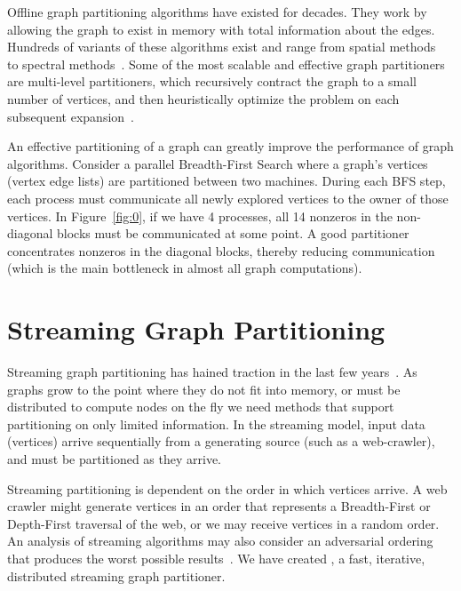 
Offline graph partitioning algorithms have existed for decades.
They work by allowing the graph to exist in memory with total information about the edges.
Hundreds of variants of these algorithms exist and range from spatial methods~\cite{Gilbert95geometricmesh} to spectral methods~\cite{arora2009expander}.
Some of the most scalable and effective graph partitioners are multi-level partitioners, which recursively contract the graph to a small number of vertices, and then heuristically optimize the problem on each subsequent expansion~\cite{karypis1998multilevel}. 

An effective partitioning of a graph can greatly improve the performance of graph algorithms.
Consider a parallel Breadth-First Search where a graph's vertices (vertex edge lists) are partitioned between two machines.
During each BFS step, each process must communicate all newly explored vertices to the owner of those vertices.
In Figure~\ref{fig:0}, if we have 4 processes, all 14 nonzeros in the non-diagonal blocks must be communicated at some point.
A good partitioner concentrates nonzeros in the diagonal blocks, thereby reducing communication (which is the main bottleneck in almost all graph computations). 

\section{Streaming Graph Partitioning}
Streaming graph partitioning has hained traction in the last few years~\cite{DBLP:journals/corr/abs-1212-1121,Stanton:2012:SGP:2339530.2339722,tsourakakis2012fennel}.
As graphs grow to the point where they do not fit into memory, or must be distributed to compute nodes on the fly we need methods that support partitioning on only limited information.
In the streaming model, input data (vertices) arrive sequentially from a generating source (such as a web-crawler), and must be partitioned as they arrive.

Streaming partitioning is dependent on the order in which vertices arrive.
A web crawler might generate vertices in an order that represents a Breadth-First or Depth-First traversal of the web, or we may receive vertices in a random order.
An analysis of streaming algorithms may also consider an adversarial ordering that produces the worst possible results~\cite{Stanton:2012:SGP:2339530.2339722}.
We have created \ourmethod, a fast, iterative, distributed streaming graph partitioner. 


